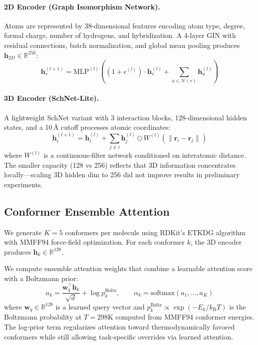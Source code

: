 \documentclass[11pt]{article}
\begin{document}
\paragraph{2D Encoder (Graph Isomorphism Network).}
Atoms are represented by 38-dimensional features encoding atom type, degree, formal charge, number of hydrogens, and hybridization. A 4-layer GIN \citep{xu2019powerful} with residual connections, batch normalization, and global mean pooling produces $\mathbf{h}_{2D} \in \mathbb{R}^{256}$:
\begin{equation}
    \mathbf{h}_v^{(l+1)} = \text{MLP}^{(l)}\!\left((1+\epsilon^{(l)})\cdot \mathbf{h}_v^{(l)} + \sum_{u \in \mathcal{N}(v)} \mathbf{h}_u^{(l)}\right)
\end{equation}

\paragraph{3D Encoder (SchNet-Lite).}
A lightweight SchNet variant \citep{schutt2017schnet} with 3 interaction blocks, 128-dimensional hidden states, and a 10\,\AA{} cutoff processes atomic coordinates:
\begin{equation}
    \mathbf{h}_i^{(l+1)} = \mathbf{h}_i^{(l)} + \sum_{j \neq i} \mathbf{h}_j^{(l)} \odot W^{(l)}\!\left(\|\mathbf{r}_i - \mathbf{r}_j\|\right)
\end{equation}
where $W^{(l)}$ is a continuous-filter network conditioned on interatomic distance. The smaller capacity (128 vs 256) reflects that 3D information concentrates locally---scaling 3D hidden dim to 256 did not improve results in preliminary experiments.

\subsection{Conformer Ensemble Attention}
\label{sec:conformer_attention}

We generate $K=5$ conformers per molecule using RDKit's ETKDG algorithm \citep{riniker2015better} with MMFF94 force-field optimization. For each conformer $k$, the 3D encoder produces $\mathbf{h}_k \in \mathbb{R}^{128}$.

We compute ensemble attention weights that combine a learnable attention score with a Boltzmann prior:
\begin{equation}
    a_k = \frac{\mathbf{w}_q^\top \mathbf{h}_k}{\sqrt{d}} + \log p_k^{\text{Boltz}}, \qquad
    \alpha_k = \text{softmax}(a_1, \ldots, a_K)
\end{equation}
where $\mathbf{w}_q \in \mathbb{R}^{128}$ is a learned query vector and $p_k^{\text{Boltz}} \propto \exp(-E_k / k_{\mathrm{B}} T)$ is the Boltzmann probability at $T = 298$K computed from MMFF94 conformer energies. The log-prior term regularizes attention toward thermodynamically favored conformers while still allowing task-specific overrides via learned attention.
\end{document}
